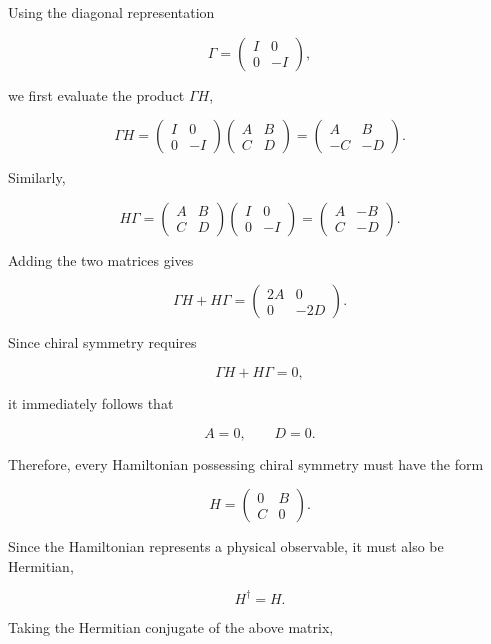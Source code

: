 \documentclass[11pt, a4paper]{article}
\begin{document}
Using the diagonal representation

\[
\Gamma=
\begin{pmatrix}
I&0\\
0&-I
\end{pmatrix},
\]

we first evaluate the product $\Gamma H$,

\[
\Gamma H
=
\begin{pmatrix}
I&0\\
0&-I
\end{pmatrix}
\begin{pmatrix}
A&B\\
C&D
\end{pmatrix}
=
\begin{pmatrix}
A&B\\
-C&-D
\end{pmatrix}.
\]

Similarly,

\[
H\Gamma
=
\begin{pmatrix}
A&B\\
C&D
\end{pmatrix}
\begin{pmatrix}
I&0\\
0&-I
\end{pmatrix}
=
\begin{pmatrix}
A&-B\\
C&-D
\end{pmatrix}.
\]

Adding the two matrices gives

\[
\Gamma H+H\Gamma
=
\begin{pmatrix}
2A&0\\
0&-2D
\end{pmatrix}.
\]

Since chiral symmetry requires

\[
\Gamma H+H\Gamma=0,
\]

it immediately follows that

\[
A=0,
\qquad
D=0.
\]

Therefore, every Hamiltonian possessing chiral symmetry must have the form

\[
H=
\begin{pmatrix}
0&B\\
C&0
\end{pmatrix}.
\]

Since the Hamiltonian represents a physical observable, it must also be
Hermitian,

\[
H^\dagger=H.
\]

Taking the Hermitian conjugate of the above matrix,
\end{document}
